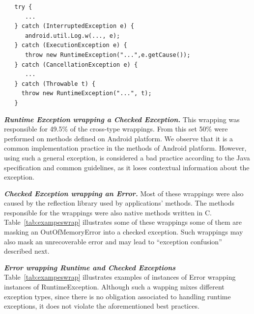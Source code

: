 

{\footnotesize
\begin{verbatim}
   try {
      ...
   } catch (InterruptedException e) {
      android.util.Log.w(..., e);
   } catch (ExecutionException e) {
      throw new RuntimeException("...",e.getCause());
   } catch (CancellationException e) {
      ...
   } catch (Throwable t) {
     throw new RuntimeException("...", t);
   }
\end{verbatim}
}

\emph{\textbf{Runtime Exception wrapping a Checked Exception.}} 
This wrapping was responsible for 49.5\% of
the cross-type wrappings.  From this set 50\%  were performed on methods defined on Android platform. 
We observe that it is a common implementation practice in the methods of Android platform.
However, using such a general exception, is considered a bad practice
according to the Java specification and common guidelines, as it loses contextual information about the exception.

\bigskip


\bigskip

\emph{\textbf{Checked Exception wrapping an Error.}} Most of these wrappings
 were also caused by the reflection library used by applications' methods. The methods responsible for the wrappings
were also native methods written in C. Table~\ref{tab:exampeswrap} illustrates
some of these wrappings some of them are masking an OutOfMemoryError
into a checked exception. Such wrappings may also mask an unrecoverable error
and may lead to ``exception confusion'' described next.

\emph{\textbf{Error wrapping Runtime and Checked Exceptions}} Table~\ref{tab:exampeswrap}  illustrates
examples of instances of Error wrapping instances of
RuntimeException. 
Although such a wapping mixes different exception types,
since there is no obligation associated to handling runtime exceptions, it
does not violate the aforementioned best practices. 

